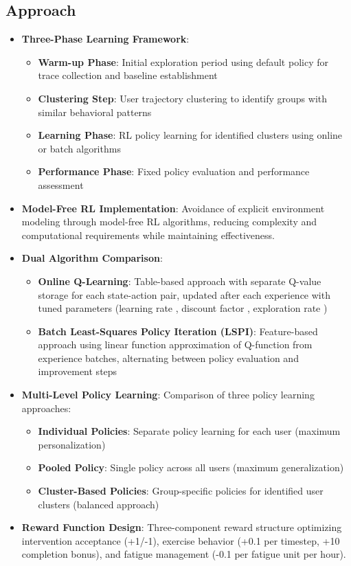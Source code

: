 \subsection*{Approach}
\begin{itemize}
    \item \textbf{Three-Phase Learning Framework}:
    \begin{itemize}
        \item \textbf{Warm-up Phase}: Initial exploration period using default policy for trace collection and baseline establishment
        \item \textbf{Clustering Step}: User trajectory clustering to identify groups with similar behavioral patterns
        \item \textbf{Learning Phase}: RL policy learning for identified clusters using online or batch algorithms
        \item \textbf{Performance Phase}: Fixed policy evaluation and performance assessment
    \end{itemize}
    \item \textbf{Model-Free RL Implementation}: Avoidance of explicit environment modeling through model-free RL algorithms, reducing complexity and computational requirements while maintaining effectiveness.
    \item \textbf{Dual Algorithm Comparison}:
    \begin{itemize}
        \item \textbf{Online Q-Learning}: Table-based approach with separate Q-value storage for each state-action pair, updated after each experience with tuned parameters (learning rate , discount factor , exploration rate )
        \item \textbf{Batch Least-Squares Policy Iteration (LSPI)}: Feature-based approach using linear function approximation of Q-function from experience batches, alternating between policy evaluation and improvement steps
    \end{itemize}
    \item \textbf{Multi-Level Policy Learning}: Comparison of three policy learning approaches:
    \begin{itemize}
        \item \textbf{Individual Policies}: Separate policy learning for each user (maximum personalization)
        \item \textbf{Pooled Policy}: Single policy across all users (maximum generalization)
        \item \textbf{Cluster-Based Policies}: Group-specific policies for identified user clusters (balanced approach)
    \end{itemize}
    \item \textbf{Reward Function Design}: Three-component reward structure optimizing intervention acceptance (+1/-1), exercise behavior (+0.1 per timestep, +10 completion bonus), and fatigue management (-0.1 per fatigue unit per hour).
\end{itemize}

